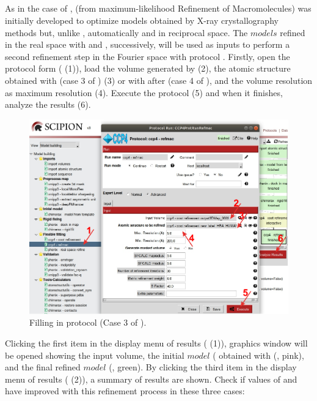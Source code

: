   \subsection*{  }
  
  As in the case of \coot,  (from maximum-likelihood Refinement of Macromolecules) was initially developed to optimize models obtained by X-ray crystallography methods but, unlike \coot, automatically and in reciprocal space. The $models$ refined in the real space with \coot and \phenix {}, successively, will be used as inputs to perform a second refinement step in the Fourier space with  protocol . Firstly, open the  protocol form ( (1)), load the volume generated by \coot (2), the atomic structure obtained with \coot (case 3 of ) (3) or with \phenix {} after \coot (case 4 of ), and the volume resolution as maximum resolution (4). Execute the protocol (5) and when it finishes, analyze the results (6).
  
  \begin{figure}[H]
  \centering 
  \captionsetup{width=.9\linewidth} 
  \includegraphics[width=1\textwidth]{Images/Fig31}
  \caption{Filling in  protocol (Case 3 of ).}
  \label{fig:refmac_protocol}
  \end{figure}
  Clicking the first item in the display menu of results ( (1)), \chimera graphics window will be opened showing the input volume, the initial $model$ ( obtained with \coot (, pink), and the final  refined $model$ (, green). By clicking the third item in the display menu of results ( (2)), a summary of  results are shown. Check if values of  and  have improved with this refinement process in these three cases:
  
